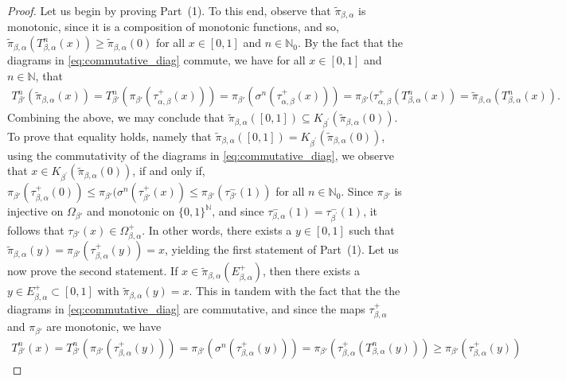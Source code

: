 \documentclass[a4paper,reqno,10pt]{amsart}
\begin{document}
\begin{proof}
Let us begin by proving Part~(1). To this end, observe that $\tilde{\pi}_{\beta,\alpha}$ is monotonic, since it is a composition of monotonic functions, and so, $\tilde{\pi}_{\beta,\alpha}(T_{\beta,\alpha}^n(x)) \geq \tilde{\pi}_{\beta,\alpha}(0)$ for all $x \in [0,1]$ and $n \in \mathbb{N}_{0}$. By the fact that the diagrams in \eqref{eq:commutative_diag} commute, we have for all $x \in [0,1]$ and $n \in \mathbb{N}$, that 
    \begin{align*}
        T_{\beta'}^{n}(\tilde{\pi}_{\beta,\alpha}(x))
        = T_{\beta'}^{n}(\pi_{\beta'}(\tau^{+}_{\alpha,\beta}(x)))
        = \pi_{\beta'}(\sigma^{n}(\tau^{+}_{\alpha,\beta}(x)))
        = \pi_{\beta'}(\tau^{+}_{\alpha,\beta}(T^{n}_{\beta,\alpha}(x))
        = \tilde{\pi}_{\beta,\alpha}(T^{n}_{\beta,\alpha}(x)).
    \end{align*}
Combining the above, we may conclude that $\tilde{\pi}_{\beta,\alpha}([0,1]) \subseteq  K_{\beta^\prime}(\tilde{\pi}_{\beta,\alpha}(0))$. To prove that equality holds, namely that $\tilde{\pi}_{\beta,\alpha}([0,1]) =  K_{\beta^\prime}(\tilde{\pi}_{\beta,\alpha}(0))$, using the commutativity of the diagrams in \eqref{eq:commutative_diag}, we observe that $x \in K_{\beta^\prime}(\tilde{\pi}_{\beta,\alpha}(0))$, if and only if, $\pi_{\beta'}(\tau^{+}_{\beta,\alpha}(0)) \leq \pi_{\beta'}(\sigma^{n}(\tau^{+}_{\beta'}(x)) \leq \pi_{\beta'}(\tau_{\beta'}^{-}(1))$ for all $n \in \mathbb{N}_{0}$. Since $\pi_{\beta'}$ is injective on $\Omega_{\beta'}$ and monotonic on $\{0,1\}^{\mathbb{N}}$, and since $\tau_{\beta,\alpha}^-(1)=\tau_{\beta^\prime}^-(1)$, it follows that $\tau_{\beta'}(x) \in \Omega^{+}_{\beta, \alpha}$.  In other words, there exists a $y \in [0,1]$ such that $\tilde{\pi}_{\beta,\alpha}(y) = \pi_{\beta'}(\tau^{+}_{\beta,\alpha}(y)) = x$, yielding the first statement of Part~(1). Let us now prove the second statement. If $x \in \tilde{\pi}_{\beta,\alpha}(E_{\beta,\alpha}^{+})$, then there exists a $y \in E_{\beta,\alpha}^{+} \subset [0,1]$ with $\tilde{\pi}_{\beta,\alpha}(y) = x$. This in tandem with the fact that the the diagrams in \eqref{eq:commutative_diag} are commutative, and since the maps $\tau_{\beta,\alpha}^{+}$ and $\pi_{\beta'}$ are monotonic, we have 
    \begin{align*}
        T_{\beta'}^{n}(x)
        = T_{\beta'}^{n}( \pi_{\beta'}(\tau_{\beta,\alpha}^{+}(y)))
        = \pi_{\beta'}(\sigma^{n}(\tau_{\beta,\alpha}^{+}(y)))
        = \pi_{\beta'}(\tau_{\beta,\alpha}^{+}(T_{\beta,\alpha}^{n}(y)))
        \geq \pi_{\beta'}(\tau_{\beta,\alpha}^{+}(y))

\end{align*}
\end{proof}
\end{document}
